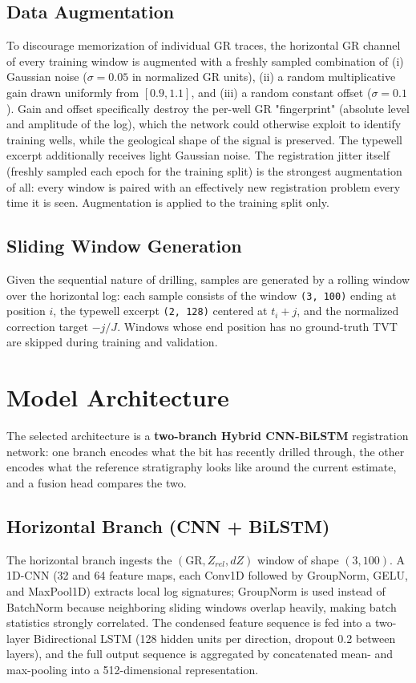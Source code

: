 \documentclass[12pt, a4paper]{article}
\begin{document}
    \subsection{Data Augmentation}
    To discourage memorization of individual GR traces, the horizontal GR channel of every training window is augmented with a freshly sampled combination of (i) Gaussian noise ($\sigma = 0.05$ in normalized GR units), (ii) a random multiplicative gain drawn uniformly from $[0.9, 1.1]$, and (iii) a random constant offset ($\sigma = 0.1$). Gain and offset specifically destroy the per-well GR "fingerprint" (absolute level and amplitude of the log), which the network could otherwise exploit to identify training wells, while the geological shape of the signal is preserved. The typewell excerpt additionally receives light Gaussian noise. The registration jitter itself (freshly sampled each epoch for the training split) is the strongest augmentation of all: every window is paired with an effectively new registration problem every time it is seen. Augmentation is applied to the training split only.

    \subsection{Sliding Window Generation}
    Given the sequential nature of drilling, samples are generated by a rolling window over the horizontal log: each sample consists of the window \texttt{(3, 100)} ending at position $i$, the typewell excerpt \texttt{(2, 128)} centered at $t_i + j$, and the normalized correction target $-j/J$. Windows whose end position has no ground-truth TVT are skipped during training and validation.

    \section{Model Architecture}

    The selected architecture is a \textbf{two-branch Hybrid CNN-BiLSTM} registration network: one branch encodes what the bit has recently drilled through, the other encodes what the reference stratigraphy looks like around the current estimate, and a fusion head compares the two.

    \subsection{Horizontal Branch (CNN + BiLSTM)}
    The horizontal branch ingests the $(\text{GR}, Z_{rel}, dZ)$ window of shape $(3, 100)$. A 1D-CNN (32 and 64 feature maps, each Conv1D followed by GroupNorm, GELU, and MaxPool1D) extracts local log signatures; GroupNorm is used instead of BatchNorm because neighboring sliding windows overlap heavily, making batch statistics strongly correlated. The condensed feature sequence is fed into a two-layer Bidirectional LSTM (128 hidden units per direction, dropout 0.2 between layers), and the full output sequence is aggregated by concatenated mean- and max-pooling into a 512-dimensional representation.
\end{document}
